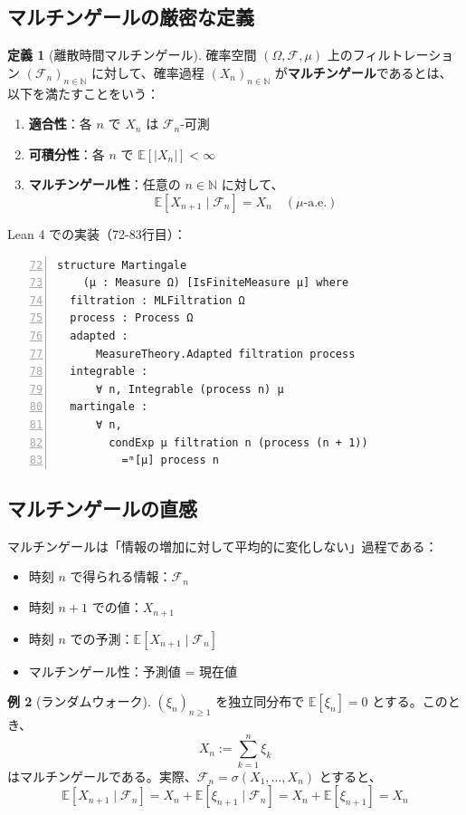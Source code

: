 \documentclass[12pt,a4paper]{article}
\theoremstyle{definition}
\newtheorem{definition}{定義}[section]
\newtheorem{example}[definition]{例}
\newcommand{\N}{\mathbb{N}}
\newcommand{\E}{\mathbb{E}}
\newcommand{\cF}{\mathcal{F}}
\begin{document}
\subsection{マルチンゲールの厳密な定義}

\begin{definition}[離散時間マルチンゲール]
確率空間 $(\Omega, \cF, \mu)$ 上のフィルトレーション $(\cF_n)_{n \in \N}$ に対して、確率過程 $(X_n)_{n \in \N}$ が\textbf{マルチンゲール}であるとは、以下を満たすことをいう：
\begin{enumerate}
\item \textbf{適合性}：各 $n$ で $X_n$ は $\cF_n$-可測
\item \textbf{可積分性}：各 $n$ で $\E[|X_n|] < \infty$
\item \textbf{マルチンゲール性}：任意の $n \in \N$ に対して、
\[
\E[X_{n+1} \mid \cF_n] = X_n \quad (\mu\text{-a.e.})
\]
\end{enumerate}
\end{definition}

Lean 4 での実装（72-83行目）：

\begin{lstlisting}[language=Lean,numbers=left,firstnumber=72]
structure Martingale
    (μ : Measure Ω) [IsFiniteMeasure μ] where
  filtration : MLFiltration Ω
  process : Process Ω
  adapted :
      MeasureTheory.Adapted filtration process
  integrable :
      ∀ n, Integrable (process n) μ
  martingale :
      ∀ n,
        condExp μ filtration n (process (n + 1))
          =ᵐ[μ] process n
\end{lstlisting}

\subsection{マルチンゲールの直感}

マルチンゲールは「情報の増加に対して平均的に変化しない」過程である：

\begin{itemize}
\item 時刻 $n$ で得られる情報：$\cF_n$
\item 時刻 $n+1$ での値：$X_{n+1}$
\item 時刻 $n$ での予測：$\E[X_{n+1} \mid \cF_n]$
\item マルチンゲール性：予測値 = 現在値
\end{itemize}

\begin{example}[ランダムウォーク]
$(\xi_n)_{n \geq 1}$ を独立同分布で $\E[\xi_n] = 0$ とする。このとき、
\[
X_n := \sum_{k=1}^n \xi_k
\]
はマルチンゲールである。実際、$\cF_n = \sigma(X_1, \ldots, X_n)$ とすると、
\[
\E[X_{n+1} \mid \cF_n] = X_n + \E[\xi_{n+1} \mid \cF_n] = X_n + \E[\xi_{n+1}] = X_n
\]
\end{example}
\end{document}
